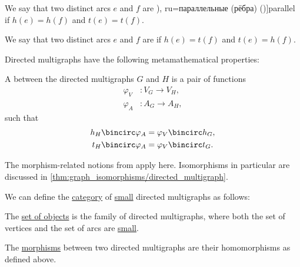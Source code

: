 \begin{definition}
\begin{thmenum}[resume=def:directed_multigraph]
     We say that two distinct arcs \( e \) and \( f \) are \term[bg=паралелни (ребра) (\cite[7]{Мирчев2001Графи}), ru=параллельные (рёбра) (\cite[279]{ЕмеличевИПр1990ТеорияГрафов})]{parallel} if \( h(e) = h(f) \) and \( t(e) = t(f) \).

    \mimprovised We say that two distinct arcs \( e \) and \( f \) are  if \( h(e) = t(f) \) and \( t(e) = h(f) \).
  \end{thmenum}

  Directed multigraphs have the following metamathematical properties:
  \begin{thmenum}[resume=def:directed_multigraph]
     A  between the directed multigraphs \( G \) and \( H \) is a pair of functions
    \begin{align*}
      \varphi_V &: V_G \to V_H, \\
      \varphi_A &: A_G \to A_H,
    \end{align*}
    such that
    \begin{align}
      h_H \bincirc \varphi_A &= \varphi_V \bincirc h_G, \label{eq:def:directed_multigraph/morphism/head} \\
      t_H \bincirc \varphi_A &= \varphi_V \bincirc t_G. \label{eq:def:directed_multigraph/morphism/tail}
    \end{align}

    The morphism-related notions from  apply here. Isomorphisms in particular are discussed in \cref{thm:graph_isomorphisms/directed_multigraph}.

     We can define the \hyperref[def:category]{category} of \hyperref[def:small_set]{small} directed multigraphs as follows:

    \begin{thmenum}
       The \hyperref[def:category/objects]{set of objects} is the family of directed multigraphs, where both the set of vertices and the set of arcs are \hyperref[def:small_set]{small}.

       The \hyperref[def:category/morphisms]{morphisms} between two directed multigraphs are their homomorphisms as defined above.


\end{thmenum}
\end{thmenum}
\end{definition}

